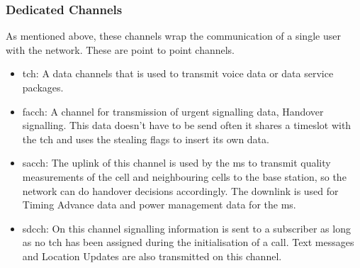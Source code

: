 \subsubsection{Dedicated Channels}
As mentioned above, these channels wrap the communication of a single user with the network.
These are point to point channels.
\begin{itemize}
	\item \gls{tch}: A data channels that is used to transmit voice data or data service packages.
	\item \gls{facch}: A channel for transmission of urgent signalling data, \eg Handover signalling.
	This data doesn't have to be send often it shares a timeslot with the \gls{tch} and uses the stealing flags to insert its own data.
	\item \gls{sacch}: The uplink of this channel is used by the \gls{ms} to transmit quality measurements of the cell and neighbouring cells to the base station, so the network can do handover decisions accordingly.
	The downlink is used for Timing Advance data and power management data for the \gls{ms}.
	\item \gls{sdcch}: On this channel signalling information is sent to a subscriber as long as no \gls{tch} has been assigned during the initialisation of a call.
	Text messages and Location Updates are also transmitted on this channel.
\end{itemize}


